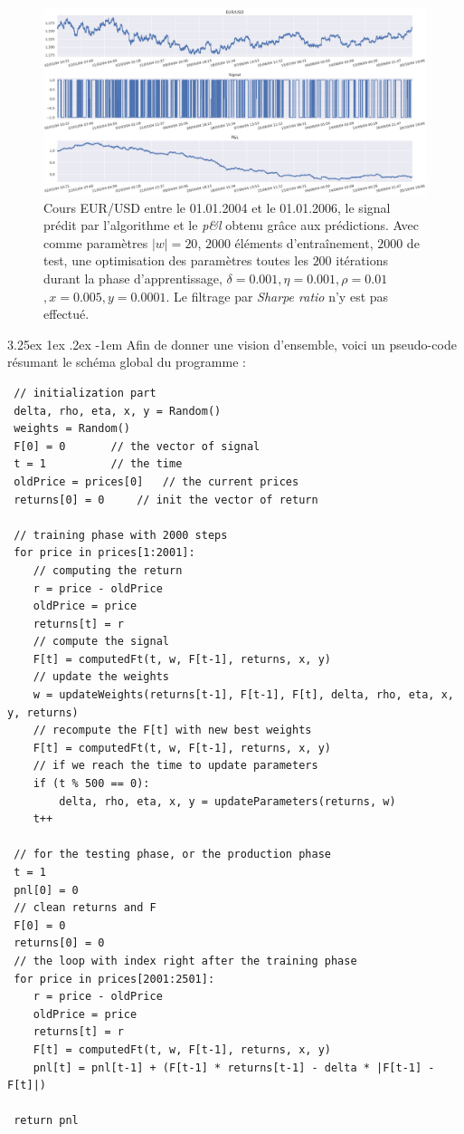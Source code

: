 \documentclass[a4paper, 11pt]{article}
\makeatletter
\renewcommand\paragraph{\@startsection{paragraph}{5}{\z@}%
  {3.25ex \@plus1ex \@minus.2ex}%
  {-1em}%
  {\normalfont\normalsize\bfseries}}
\makeatother
\begin{document}
\begin{figure}
	\centering
	\includegraphics[scale=0.5]{res/exemple_sans_filtrage}
	\caption[Blup]{Cours EUR/USD entre le 01.01.2004 et le 01.01.2006, le signal prédit par l'algorithme et le \textit{p\&l} obtenu grâce aux prédictions. Avec comme paramètres $|w| = 20$, $2000$ éléments d'entraînement, $2000$ de test, une optimisation des
		paramètres toutes les $200$ itérations durant la phase d'apprentissage, $\delta = 0.001, \eta=0.001,\rho=0.01$
		\footnotemark$, x = 0.005, y=0.0001$. Le filtrage par \textit{Sharpe ratio} n'y est pas effectué.}
	\label{exemple sans filtrage}
\end{figure}
\clearpage

\paragraph{}
Afin de donner une vision d'ensemble, voici un pseudo-code résumant le schéma global du programme :
  \begin{lstlisting}
 // initialization part
 delta, rho, eta, x, y = Random()
 weights = Random()
 F[0] = 0		// the vector of signal
 t = 1			// the time
 oldPrice = prices[0]	// the current prices
 returns[0] = 0		// init the vector of return
 
 // training phase with 2000 steps
 for price in prices[1:2001]:
 	// computing the return
 	r = price - oldPrice
 	oldPrice = price
 	returns[t] = r
 	// compute the signal
 	F[t] = computedFt(t, w, F[t-1], returns, x, y)
 	// update the weights
 	w = updateWeights(returns[t-1], F[t-1], F[t], delta, rho, eta, x, y, returns)
 	// recompute the F[t] with new best weights
 	F[t] = computedFt(t, w, F[t-1], returns, x, y)
 	// if we reach the time to update parameters
 	if (t % 500 == 0):
 		delta, rho, eta, x, y = updateParameters(returns, w)
 	t++
 
 // for the testing phase, or the production phase
 t = 1
 pnl[0] = 0
 // clean returns and F
 F[0] = 0
 returns[0] = 0
 // the loop with index right after the training phase
 for price in prices[2001:2501]:
 	r = price - oldPrice
 	oldPrice = price
 	returns[t] = r
 	F[t] = computedFt(t, w, F[t-1], returns, x, y)
 	pnl[t] = pnl[t-1] + (F[t-1] * returns[t-1] - delta * |F[t-1] - F[t]|)
 
 return pnl
  \end{lstlisting}
 
\end{document}
